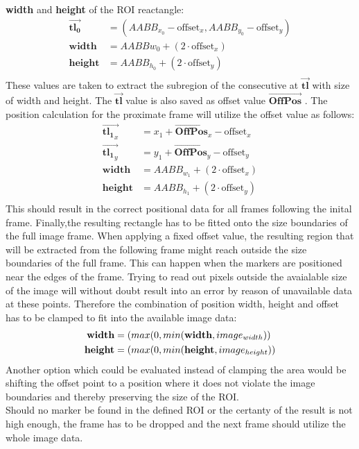 \textbf{width} and \textbf{height} of the ROI reactangle:
\begin{equation}
\begin{split}
\vec{\mathbf{tl_{0}}}&=(AABB_{x_{0}}-\text{offset}_{x},AABB_{y_{0}}-\text{offset}_{y})\\
\mathbf{width}&=AABB{w_{0}}+(2\cdot\text{offset}_{x})\\
\mathbf{height}&=AABB_{h_{0}}+(2\cdot\text{offset}_{y})\\
\end{split}
\end{equation}
These values are taken to extract the subregion of the consecutive at $\vec{\mathbf{tl}}$ with size of width and height. The $\vec{\mathbf{tl}}$ value is also saved as offset value $\vec{\mathbf{OffPos}}$ .
The position calculation for the proximate frame will utilize the offset value as follows:
\begin{equation}
\begin{split}
\vec{\mathbf{tl_{1}}_{x}}&=x_{1}+\vec{\mathbf{OffPos}}_{x}-\text{offset}_{x} \\ \vec{\mathbf{tl_{1}}_{y}}&=y_{1}+\vec{\mathbf{OffPos}}_{y}-\text{offset}_{y}\\
\mathbf{width}&=AABB_{w_{1}}+(2\cdot\text{offset}_{x})\\
\mathbf{height}&=AABB_{h_{1}}+(2\cdot\text{offset}_{y})\\
\end{split}
\end{equation}
This should result in the correct positional data for all frames following the inital frame.
Finally,the resulting rectangle has to be fitted onto the size boundaries of the full image frame. When applying a fixed offset value, the resulting region that will be extracted from the following frame might reach outside the size boundaries of the full frame. This can happen when the markers are positioned near the edges of the frame. Trying to read out pixels outside the avaialable size of the image will without doubt result into an error by reason of unavailable data at these points. Therefore the combination of position width, height and offset has to be clamped to fit into the available image data:
\begin{equation}
\begin{split}
\textbf{width}&=\text(max(0,min(\mathbf{width},image_{width}))\\
\textbf{height}&=\text(max(0,min(\mathbf{height},image_{height}))
\end{split}
\end{equation}
Another option which could be evaluated instead of clamping the area would be shifting the offset point to a position where it does not violate the image boundaries and  thereby preserving the size of the ROI.\\
Should no marker be found in the defined ROI or the certanty of the result is not high enough, the frame has to be dropped and the next frame should utilize the whole image data.

